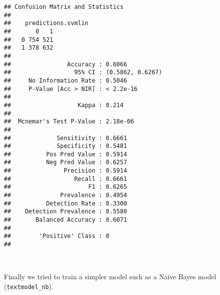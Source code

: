 \documentclass[
]{article}
\newenvironment{Shaded}{\begin{snugshade}}{\end{snugshade}}
\newcommand{\AttributeTok}[1]{\textcolor[rgb]{0.77,0.63,0.00}{#1}}
\newcommand{\DecValTok}[1]{\textcolor[rgb]{0.00,0.00,0.81}{#1}}
\newcommand{\FunctionTok}[1]{\textcolor[rgb]{0.00,0.00,0.00}{#1}}
\newcommand{\NormalTok}[1]{#1}
\newcommand{\OtherTok}[1]{\textcolor[rgb]{0.56,0.35,0.01}{#1}}
\newcommand{\SpecialCharTok}[1]{\textcolor[rgb]{0.00,0.00,0.00}{#1}}
\newcommand{\StringTok}[1]{\textcolor[rgb]{0.31,0.60,0.02}{#1}}
\begin{document}
\begin{Shaded}
\end{Shaded}

\begin{verbatim}
## Confusion Matrix and Statistics
## 
##    predictions.svmlin
##       0   1
##   0 754 521
##   1 378 632
##                                           
##                Accuracy : 0.6066          
##                  95% CI : (0.5862, 0.6267)
##     No Information Rate : 0.5046          
##     P-Value [Acc > NIR] : < 2.2e-16       
##                                           
##                   Kappa : 0.214           
##                                           
##  Mcnemar's Test P-Value : 2.18e-06        
##                                           
##             Sensitivity : 0.6661          
##             Specificity : 0.5481          
##          Pos Pred Value : 0.5914          
##          Neg Pred Value : 0.6257          
##               Precision : 0.5914          
##                  Recall : 0.6661          
##                      F1 : 0.6265          
##              Prevalence : 0.4954          
##          Detection Rate : 0.3300          
##    Detection Prevalence : 0.5580          
##       Balanced Accuracy : 0.6071          
##                                           
##        'Positive' Class : 0               
## 
\end{verbatim}

~

Finally we tried to train a simpler model such as a Naive Bayes model
(\texttt{textmodel\_nb}).
\end{document}
